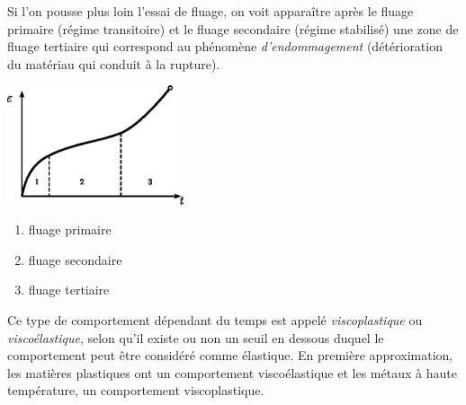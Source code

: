 Si l'on pousse plus loin l'essai de fluage, on voit apparaître après le fluage primaire (régime transitoire) et le fluage secondaire (régime stabilisé) une zone de fluage tertiaire qui correspond au phénomène \emph{d'endommagement} (détérioration du matériau qui conduit à la rupture).
\begin{multicols}{2}
    \begin{center}
        \includegraphics[height=3.5cm]{../images/T1_Ch04-0021}
    \end{center}
    \columnbreak
    \begin{enumerate}
        \item fluage primaire
        \item fluage secondaire
        \item fluage tertiaire
    \end{enumerate}
\end{multicols}

Ce type de comportement dépendant du temps est appelé \emph{viscoplastique} ou \emph{viscoélastique}, selon qu'il existe ou non un seuil en dessous duquel le comportement peut être considéré comme élastique.
En première approximation, les matières plastiques ont un comportement viscoélastique et les métaux à haute température, un comportement viscoplastique.


